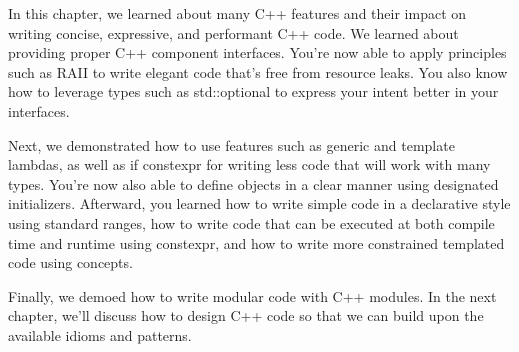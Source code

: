 In this chapter, we learned about many C++ features and their impact on writing concise, expressive, and performant C++ code. We learned about providing proper C++ component interfaces. You're now able to apply principles such as RAII to write elegant code that's free from resource leaks. You also know how to leverage types such as std::optional to express your intent better in your interfaces.

Next, we demonstrated how to use features such as generic and template lambdas, as well as if constexpr for writing less code that will work with many types. You're now also able to define objects in a clear manner using designated initializers. Afterward, you learned how to write simple code in a declarative style using standard ranges, how to write code that can be executed at both compile time and runtime using constexpr, and how to write more constrained templated code using concepts.

Finally, we demoed how to write modular code with C++ modules. In the next chapter, we'll discuss how to design C++ code so that we can build upon the available idioms and patterns.